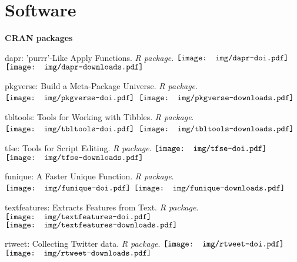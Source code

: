 \section{Software}

  \textbf{CRAN packages}
    \begin{innerlist}

      \item dapr: 'purrr'-Like Apply Functions. \textit{R package}.
      \href{https://doi.org/10.5281/zenodo.2528504}{$\vcenter{\hbox{\texttt{[image: img/dapr-doi.pdf]}}}$}
      $\vcenter{\hbox{\texttt{[image: img/dapr-downloads.pdf]}}}$

      \item  pkgverse: Build a Meta-Package Universe. \textit{R package}.
      \href{https://zenodo.org/badge/latestdoi/136514892}{$\vcenter{\hbox{\texttt{[image: img/pkgverse-doi.pdf]}}}$}
      $\vcenter{\hbox{\texttt{[image: img/pkgverse-downloads.pdf]}}}$

      \item tbltools: Tools for Working with Tibbles. \textit{R package}.
      \href{https://zenodo.org/badge/latestdoi/152122857}{$\vcenter{\hbox{\texttt{[image: img/tbltools-doi.pdf]}}}$}
      $\vcenter{\hbox{\texttt{[image: img/tbltools-downloads.pdf]}}}$

      \item tfse: Tools for Script Editing. \textit{R package}.
      \href{https://zenodo.org/badge/latestdoi/62493045}{$\vcenter{\hbox{\texttt{[image: img/tfse-doi.pdf]}}}$}
      $\vcenter{\hbox{\texttt{[image: img/tfse-downloads.pdf]}}}$

      \item funique: A Faster Unique Function. \textit{R package}.
      \href{https://zenodo.org/badge/latestdoi/133566034}{$\vcenter{\hbox{\texttt{[image: img/funique-doi.pdf]}}}$}
      $\vcenter{\hbox{\texttt{[image: img/funique-downloads.pdf]}}}$

      \item textfeatures: Extracts Features from Text. \textit{R package}.
      \href{https://zenodo.org/badge/latestdoi/123046986}{$\vcenter{\hbox{\texttt{[image: img/textfeatures-doi.pdf]}}}$}
      $\vcenter{\hbox{\texttt{[image: img/textfeatures-downloads.pdf]}}}$

      \item rtweet: Collecting Twitter data. \textit{R package}.
      \href{https://zenodo.org/badge/latestdoi/64161359}{$\vcenter{\hbox{\texttt{[image: img/rtweet-doi.pdf]}}}$}
      $\vcenter{\hbox{\texttt{[image: img/rtweet-downloads.pdf]}}}$

    \end{innerlist}\vspace{1em}

